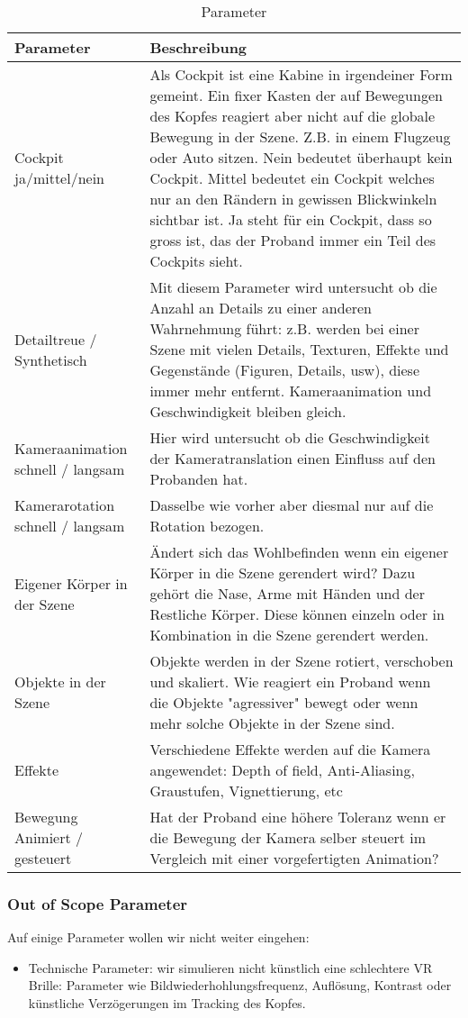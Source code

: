 \begin{table}[]

\label{my-label}
\begin{tabular}{|l| p{8cm} |}
\hline
\textbf{Parameter} & \textbf{Beschreibung} \\ \hline
Cockpit ja/mittel/nein
& Als Cockpit ist eine Kabine in irgendeiner Form gemeint. Ein fixer Kasten der auf Bewegungen des Kopfes reagiert aber nicht auf die globale Bewegung in der Szene. Z.B. in einem Flugzeug oder Auto sitzen. Nein bedeutet überhaupt kein Cockpit. Mittel bedeutet ein Cockpit welches nur an den Rändern in gewissen Blickwinkeln sichtbar ist. Ja steht für ein Cockpit, dass so gross ist, das der Proband immer ein Teil des Cockpits sieht.                      \\ \hline
Detailtreue / Synthetisch
& Mit diesem Parameter wird untersucht ob die Anzahl an Details zu einer anderen Wahrnehmung führt: z.B. werden bei einer Szene mit vielen Details, Texturen, Effekte und Gegenstände (Figuren, Details, usw), diese immer mehr entfernt. Kameraanimation und Geschwindigkeit bleiben gleich.\\ \hline
Kameraanimation schnell / langsam 
& Hier wird untersucht ob die Geschwindigkeit der Kameratranslation einen Einfluss auf den Probanden hat.
\\ \hline
Kamerarotation schnell / langsam &
Dasselbe wie vorher aber diesmal nur auf die Rotation bezogen.
\\ \hline
Eigener Körper in der Szene &
Ändert sich das Wohlbefinden wenn ein eigener Körper in die Szene gerendert wird? Dazu gehört die Nase, Arme mit Händen und der Restliche Körper. Diese können einzeln oder in Kombination in die Szene gerendert werden.
\\ \hline
Objekte in der Szene &
Objekte werden in der Szene rotiert, verschoben und skaliert. Wie reagiert ein Proband wenn die Objekte "agressiver" bewegt oder wenn mehr solche Objekte in der Szene sind. \\ \hline
Effekte & Verschiedene Effekte werden auf die Kamera angewendet: Depth of field, Anti-Aliasing, Graustufen, Vignettierung, etc \\ \hline
Bewegung Animiert / gesteuert & Hat der Proband eine höhere Toleranz wenn er die Bewegung der Kamera selber steuert im Vergleich mit einer vorgefertigten Animation?
\end{tabular}
\caption{Parameter}
\end{table}

\subsubsection{Out of Scope Parameter}
Auf einige Parameter wollen wir nicht weiter eingehen:
\begin{itemize}
\item Technische Parameter: wir simulieren nicht künstlich eine schlechtere VR Brille: Parameter wie Bildwiederhohlungsfrequenz, Auflösung, Kontrast oder künstliche Verzögerungen im Tracking des Kopfes.
\end{itemize}


